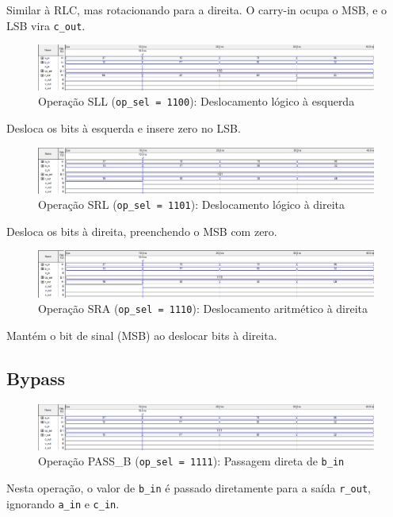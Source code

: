 Similar à RLC, mas rotacionando para a direita. O carry-in ocupa o MSB, e o LSB vira \texttt{c\_out}.

\begin{figure}[H]
\centering
\includegraphics[width=\textwidth]{images/alu_1100.png}
\caption{Operação SLL (\texttt{op\_sel = 1100}): Deslocamento lógico à esquerda}
\end{figure}

Desloca os bits à esquerda e insere zero no LSB.

\begin{figure}[H]
\centering
\includegraphics[width=\textwidth]{images/alu_1101.png}
\caption{Operação SRL (\texttt{op\_sel = 1101}): Deslocamento lógico à direita}
\end{figure}

Desloca os bits à direita, preenchendo o MSB com zero.

\begin{figure}[H]
\centering
\includegraphics[width=\textwidth]{images/alu_1110.png}
\caption{Operação SRA (\texttt{op\_sel = 1110}): Deslocamento aritmético à direita}
\end{figure}

Mantém o bit de sinal (MSB) ao deslocar bits à direita.

\subsection{Bypass}

\begin{figure}[H]
\centering
\includegraphics[width=\textwidth]{images/alu_1111.png}
\caption{Operação PASS\_B (\texttt{op\_sel = 1111}): Passagem direta de \texttt{b\_in}}
\end{figure}

Nesta operação, o valor de \texttt{b\_in} é passado diretamente para a saída \texttt{r\_out}, ignorando \texttt{a\_in} e \texttt{c\_in}.